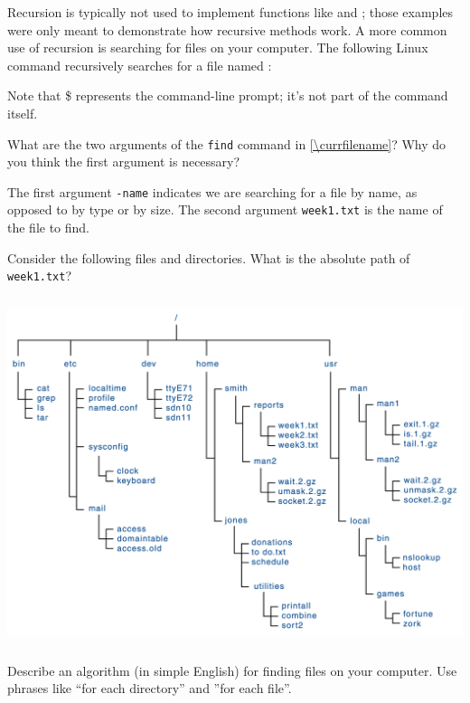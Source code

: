 
Recursion is typically not used to implement functions like  and ; those examples were only meant to demonstrate how recursive methods work.
A more common use of recursion is searching for files on your computer.
The following Linux command recursively searches for a file named :

\vspace{1em}
\vspace{1em}

Note that \$ represents the command-line prompt; it's not part of the command itself.




\Q What are the two arguments of the \texttt{find} command in \ref{\currfilename}?
Why do you think the first argument is necessary?

\begin{answer}
The first argument \texttt{-name} indicates we are searching for a file by name, as opposed to by type or by size. The second argument \texttt{week1.txt} is the name of the file to find.
\end{answer}


\Q Consider the following files and directories.
What is the absolute path of \texttt{week1.txt}?

\begin{center}
\includegraphics[height=4in]{unix-files.png}
\end{center}


\Q Describe an algorithm (in simple English) for finding files on your computer.
Use phrases like ``for each directory'' and ''for each file''.


